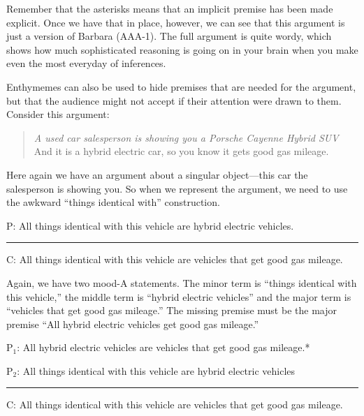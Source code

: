 Remember that the asterisks means that an implicit premise has been made explicit. Once we have that in place, however, we can see that this argument is just a version of Barbara (AAA-1). The full argument is quite wordy, which shows how much sophisticated reasoning is going on in your brain when you make even the most everyday of inferences. 

Enthymemes can also be used to hide premises that are needed for the argument, but that the audience might not accept if their attention were drawn to them. Consider this argument:

\begin{quotation}\noindent \textit{A used car salesperson is showing you a Porsche Cayenne Hybrid SUV} And it is a hybrid electric car, so you know it gets good gas mileage. \end{quotation}

Here again we have an argument about a singular object---this car the salesperson is showing you. So when we represent the argument, we need to use the awkward ``things identical with'' construction.

\begin{earg}
\item[P:] All things identical with this vehicle are hybrid electric vehicles.
\vspace{-.5em}
\item [] \rule{0.7\linewidth}{.5pt} 
\item[C:] All things identical with this vehicle are vehicles that get good gas mileage.
\end{earg} 

Again, we have two mood-A statements. The minor term is ``things identical with this vehicle,'' the middle term is ``hybrid electric vehicles'' and the major term is ``vehicles that get good gas mileage.'' The missing premise must be the major premise ``All hybrid electric vehicles get good gas mileage.'' 

\begin{earg}
\item[P$_1$:] All hybrid electric vehicles are vehicles that get good gas mileage.*
\item[P$_2$:] All things identical with this vehicle are hybrid electric vehicles
\vspace{-.5em}
\item [] \rule{0.7\linewidth}{.5pt} 
\item[C:] All things identical with this vehicle are vehicles that get good gas mileage.
\end{earg} 

